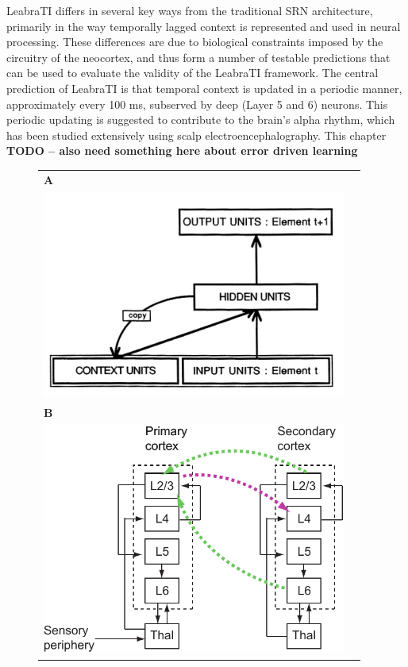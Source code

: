 \documentclass[dwyatte_dissertation.tex]{subfiles}
\begin{document}
LeabraTI differs in several key ways from the traditional SRN architecture, primarily in the way temporally lagged context is represented and used in neural processing. These differences are due to biological constraints imposed by the circuitry of the neocortex, and thus form a number of testable predictions that can be used to evaluate the validity of the LeabraTI framework. The central prediction of LeabraTI is that temporal context is updated in a periodic manner, approximately every 100 ms, subserved by deep (Layer 5 and 6) neurons. This periodic updating is suggested to contribute to the brain's alpha rhythm, which has been studied extensively using scalp electroencephalography. This chapter \textbf{TODO -- also need something here about error driven learning}


\begin{figure}[h!]
\begin{center}
\begin{tabular}{ll}
\textbf{A} \\
\includegraphics[width=100mm]{figs/chap_leabrati/srn_scm.png} \\
\textbf{B} \\
\includegraphics[width=100mm]{figs/chap_leabrati/microcircuit_horiz.pdf} \\

\end{tabular}
\end{center}
\end{figure}
\end{document}
